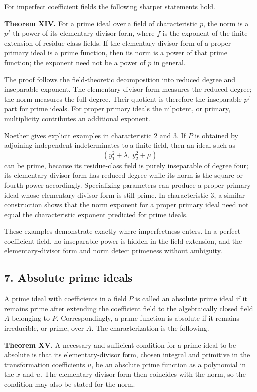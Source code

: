 \documentclass[11pt]{article}
\begin{document}
For imperfect coefficient fields the following sharper statements hold.

\textbf{Theorem XIV.} For a prime ideal over a field of characteristic $p$, the norm is a $p^f$-th power of its elementary-divisor form, where $f$ is the exponent of the finite extension of residue-class fields. If the elementary-divisor form of a proper primary ideal is a prime function, then its norm is a power of that prime function; the exponent need not be a power of $p$ in general.

The proof follows the field-theoretic decomposition into reduced degree and inseparable exponent. The elementary-divisor form measures the reduced degree; the norm measures the full degree. Their quotient is therefore the inseparable $p^f$ part for prime ideals. For proper primary ideals the nilpotent, or primary, multiplicity contributes an additional exponent.

Noether gives explicit examples in characteristic $2$ and $3$. If $P$ is obtained by adjoining independent indeterminates to a finite field, then an ideal such as
\[
  (y_1^2+\lambda,\; y_2^2+\mu)
\]
can be prime, because its residue-class field is purely inseparable of degree four; its elementary-divisor form has reduced degree while its norm is the square or fourth power accordingly. Specializing parameters can produce a proper primary ideal whose elementary-divisor form is still prime. In characteristic $3$, a similar construction shows that the norm exponent for a proper primary ideal need not equal the characteristic exponent predicted for prime ideals.

These examples demonstrate exactly where imperfectness enters. In a perfect coefficient field, no inseparable power is hidden in the field extension, and the elementary-divisor form and norm detect primeness without ambiguity.

\subsection{7. Absolute prime ideals}

A prime ideal with coefficients in a field $P$ is called an absolute prime ideal if it remains prime after extending the coefficient field to the algebraically closed field $A$ belonging to $P$. Correspondingly, a prime function is absolute if it remains irreducible, or prime, over $A$. The characterization is the following.

\textbf{Theorem XV.} A necessary and sufficient condition for a prime ideal to be absolute is that its elementary-divisor form, chosen integral and primitive in the transformation coefficients $u$, be an absolute prime function as a polynomial in the $x$ and $u$. The elementary-divisor form then coincides with the norm, so the condition may also be stated for the norm.
\end{document}
